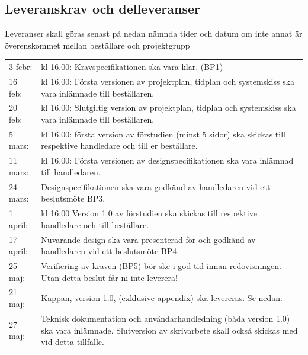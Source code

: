 \documentclass[11pt]{article}
\begin{document}
\begin{flushleft}
\pagebreak
\section{Leveranskrav och delleveranser}
Leveranser skall göras senast på nedan nämnda tider och datum om inte annat är överenskommet mellan beställare och projektgrupp
\begin{center}
\begin{longtable}{l p{.8\linewidth} }

3 febr: & 
kl 16.00: Kravspecifikationen ska vara klar. (BP1) \\

16 feb: & 
kl 16.00: Första versionen av projektplan, tidplan och systemskiss ska vara inlämnade till beställaren. \\

20 feb: & 
kl 16.00: Slutgiltig version av projektplan, tidplan och systemskiss ska vara inlämnade till beställaren. \\

5 mars: &
kl 16.00: första version av förstudien (minst 5 sidor) ska skickas till respektive handledare och till er beställare. \\

11 mars: & 
kl 16.00: Första versionen av designspecifikationen ska vara inlämnad till handledaren. \\

24 mars: &
Designspecifikationen ska vara godkänd av handledaren vid ett beslutsmöte BP3. \\

1 april: &
kl 16:00 Version 1.0 av förstudien ska skickas till respektive handledare och till beställare. \\

17 april: & 
Nuvarande design ska vara presenterad för och godkänd av handledaren vid ett beslutsmöte BP4. \\

25 maj: &
Verifiering av kraven (BP5) bör ske i god tid innan redovisningen. Utan detta beslut får ni inte leverera! \\

21 maj: &
Kappan, version 1.0, (exklusive appendix) ska levereras. Se nedan. \\

27 maj: &
Teknisk dokumentation och användarhandledning (båda version 1.0) ska vara inlämnade. Slutversion av skrivarbete skall också skickas med vid detta tillfälle. \\


\end{longtable}
\end{center}
\end{flushleft}
\end{document}
